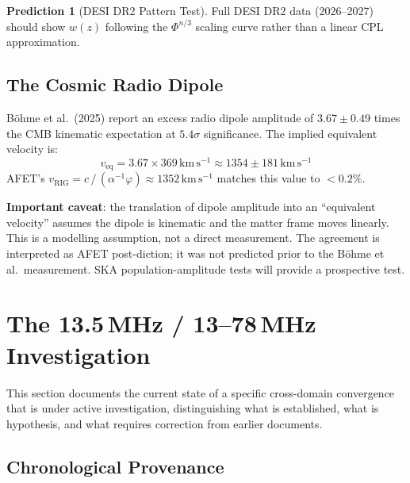 \documentclass[12pt,a4paper]{article}
\theoremstyle{definition}
\newtheorem{prediction}{Prediction}
\newcommand{\vrig}{v_{\mathrm{RIG}}}
\newcommand{\phigold}{\varphi}   %
\newcommand{\PhiAFET}{\Phi}      %
\begin{document}
\begin{prediction}[DESI DR2 Pattern Test]
Full DESI DR2 data (2026--2027) should show $w(z)$ following the $\PhiAFET^{n/3}$
scaling curve rather than a linear CPL approximation.
\end{prediction}

\subsection{The Cosmic Radio Dipole}

\begin{validated}
Böhme et al.\ (2025) report an excess radio dipole amplitude of
$3.67 \pm 0.49$ times the CMB kinematic expectation at $5.4\sigma$ significance.
The implied equivalent velocity is:
\[
  v_{\mathrm{eq}} = 3.67 \times 369\,\mathrm{km\,s^{-1}} \approx 1354\pm181\,\mathrm{km\,s^{-1}}
\]
AFET's $\vrig = c\,/\,(\alpha^{-1}\phigold) \approx 1352\,\mathrm{km\,s^{-1}}$
matches this value to $<0.2\%$.

\textbf{Important caveat}: the translation of dipole amplitude into an ``equivalent
velocity'' assumes the dipole is kinematic and the matter frame moves linearly.
This is a modelling assumption, not a direct measurement.
The agreement is interpreted as AFET post-diction; it was not predicted prior to
the Böhme et al.\ measurement. SKA population-amplitude tests will provide
a prospective test.
\end{validated}

\section{The 13.5\,MHz / 13--78\,MHz Investigation}

This section documents the current state of a specific cross-domain convergence
that is under active investigation, distinguishing what is established, what is
hypothesis, and what requires correction from earlier documents.

\subsection{Chronological Provenance}
\end{document}
